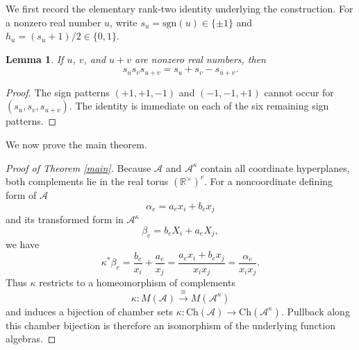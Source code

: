 \documentclass[10pt,a4paper]{amsart}
\numberwithin{equation}{section}
\newtheorem{lem}[thm]{Lemma}
\numberwithin{equation}{section}
\newcommand{\R}{\mathbb{R}}
\newcommand{\A}{\mathcal{A}}
\newcommand{\Ch}{\mathrm{Ch}}
\newcommand{\sgn}{\mathrm{sgn}}
\begin{document}
We first record the elementary rank-two identity underlying the construction.  For a nonzero real number $u$, write $s_u=\sgn(u)\in\{\pm1\}$ and $h_u=(s_u+1)/2\in\{0,1\}$.

\begin{lem}\label{sign-identity}
If $u$, $v$, and $u+v$ are nonzero real numbers, then
\[
s_us_vs_{u+v}=s_u+s_v-s_{u+v}.
\]
\end{lem}

\begin{proof}
The sign patterns $(+1,+1,-1)$ and $(-1,-1,+1)$ cannot occur for $(s_u,s_v,s_{u+v})$.  The identity is immediate on each of the six remaining sign patterns.
\end{proof}

We now prove the main theorem.


\begin{proof}[Proof of Theorem \ref{main}]
Because $\A$ and $\A^\kappa$ contain all coordinate hyperplanes, both complements lie in the real torus $(\R^\times)^r$.  For a noncoordinate defining form of $\A$
\[
\alpha_e=a_ex_i+b_ex_j
\]
and its transformed form in $\A^\kappa$
\[
\beta_e=b_eX_i+a_eX_j,
\]
we have
\begin{equation}\label{pullback}
\kappa^*\beta_e
=\frac{b_e}{x_i}+\frac{a_e}{x_j}
=\frac{a_ex_i+b_ex_j}{x_ix_j}
=\frac{\alpha_e}{x_ix_j}.
\end{equation}
Thus $\kappa$ restricts to a homeomorphism of complements
\[
\kappa:M(\A)\xrightarrow{\ \cong\ }M(\A^\kappa)
\]
and induces a bijection of chamber sets $\kappa: \Ch(\A)\to\Ch(\A^\kappa)$.  Pullback along this chamber bijection is therefore an isomorphism of the underlying function algebras.


\end{proof}
\end{document}

